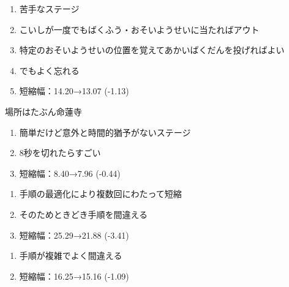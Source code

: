 \begin{enumerate}[label={\sarrow}]
\item 苦手なステージ
\item こいしが一度でもばくふう・おそいようせいに当たればアウト
\item 特定のおそいようせいの位置を覚えてあかいばくだんを投げればよい
\item でもよく忘れる
\item 短縮幅：14.20→13.07 (-1.13)
\end{enumerate}





場所はたぶん命蓮寺



\begin{enumerate}[label={\sarrow}]
\item 簡単だけど意外と時間的猶予がないステージ
\item 8秒を切れたらすごい
\item 短縮幅：8.40→7.96 (-0.44)
\end{enumerate}



\begin{enumerate}[label={\sarrow}]
\item 手順の最適化により複数回にわたって短縮
\item そのためときどき手順を間違える
\item 短縮幅：25.29→21.88 (-3.41)
\end{enumerate}



\begin{enumerate}[label={\sarrow}]
\item 手順が複雑でよく間違える
\item 短縮幅：16.25→15.16 (-1.09)
\end{enumerate}



